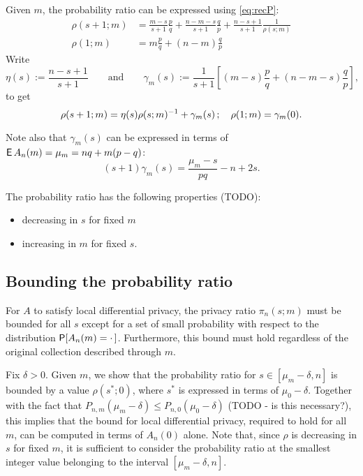 \documentclass[11pt,draft]{article}
\begin{document}
Given $m$, the probability ratio can be expressed using \eqref{eq:recP}:
\begin{align*}
\rho(s+1;m) &= \frac{m-s}{s+1}\frac{p}{q} + \frac{n-m-s}{s+1}\frac{q}{p} + \frac{n-s+1}{s+1} \frac{1}{\rho(s;m)} \\
\rho(1;m) &= m\frac{p}{q} + (n-m)\frac{q}{p}
\end{align*}
Write
\[ \eta(s) := \frac{n-s+1}{s+1} \qquad\text{and}\qquad
\gamma_m(s) := \frac{1}{s+1} \left[(m-s)\frac{p}{q} + (n-m-s)\frac{q}{p}\right], \]
to get
\begin{equation}\label{eq:probrrec}
\rho(s+1;m) = \eta(s)\inv{\rho(s;m)} + \gamma_m(s)\,; \quad
\rho(1;m) = \gamma_m(0). 
\end{equation}

Note also that $\gamma_m(s)$ can be expressed in terms of
$\EP A_n(m) = \mu_m = nq + m(p-q)$:
\[ (s+1)\gamma_m(s) = \frac{\mu_m - s}{pq} - n + 2s. \]

The probability ratio has the following properties (TODO):
\begin{itemize}
\item decreasing in $s$ for fixed $m$
\item increasing in $m$ for fixed $s$.
\end{itemize}

\subsection{Bounding the probability ratio}

For $A$ to satisfy local differential privacy, the privacy ratio $\pi_n(s;m)$
must be bounded for all $s$ except for a set of small probability with respect
to the distribution $\P[A_n(m) = \cdot\,]$.
Furthermore, this bound must hold regardless of the original collection
described through $m$.

Fix $\delta > 0$.
Given $m$, we show that the probability ratio for $s\in[\mu_m-\delta, n]$ 
is bounded by a value $\rho(s^*; 0)$, where $s^*$ is expressed in terms of
$\mu_0-\delta$.
Together with the fact that
$P_{n,m}(\mu_m - \delta) \leq P_{n,0}(\mu_0 - \delta)$ (TODO - is this
necessary?),
this implies that the bound for local differential privacy, required to hold
for all $m$, can be computed in terms of $A_n(0)$ alone.
Note that, since $\rho$ is decreasing in $s$ for fixed $m$, it is sufficient
to consider the probability ratio at the smallest integer value belonging to
the interval $[\mu_m-\delta, n]$.
\end{document}
